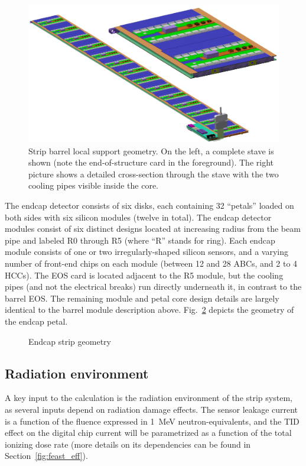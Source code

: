 \begin{figure}[ht]
\centering
\includegraphics[width=0.8\linewidth]{figures/stave.pdf}
\caption{Strip barrel local support geometry. On the left, a complete stave is shown (note the end-of-structure card in the foreground). The right picture shows a detailed cross-section through the stave with the two cooling pipes visible inside the core. }
\label{fig:barrelgeometry}
\end{figure}

The endcap detector consists of six disks, each containing 32 ``petals'' loaded on
both sides with six silicon modules (twelve in total).
The endcap detector modules consist of six distinct designs located at increasing radius from the
beam pipe and labeled R0 through R5 (where ``R'' stands for ring). Each endcap module consists of one
or two irregularly-shaped silicon sensors, and a varying number of front-end chips on each module
(between 12 and 28 ABCs, and 2 to 4 HCCs). The EOS card is located adjacent to the R5 module, but the
cooling pipes (and not the electrical breaks) run directly underneath it, in contrast to the barrel EOS.
The remaining module and petal core design details are largely identical to the barrel module description above.
Fig.~\ref{fig:endcapgeometry} depicts the geometry of the endcap petal.

\begin{figure}[ht]
\centering
\caption{Endcap strip geometry}
\label{fig:endcapgeometry}
\end{figure}

\subsection{Radiation environment}
A key input to the calculation is the radiation environment of the strip system, as several inputs depend on radiation damage effects. The sensor leakage current is a function of the fluence expressed in 1~MeV neutron-equivalents, and the TID effect on the digital chip current will be parametrized as a function of the total ionizing dose rate (more details on its dependencies can be found in Section~\ref{fig:feast_eff}). 

